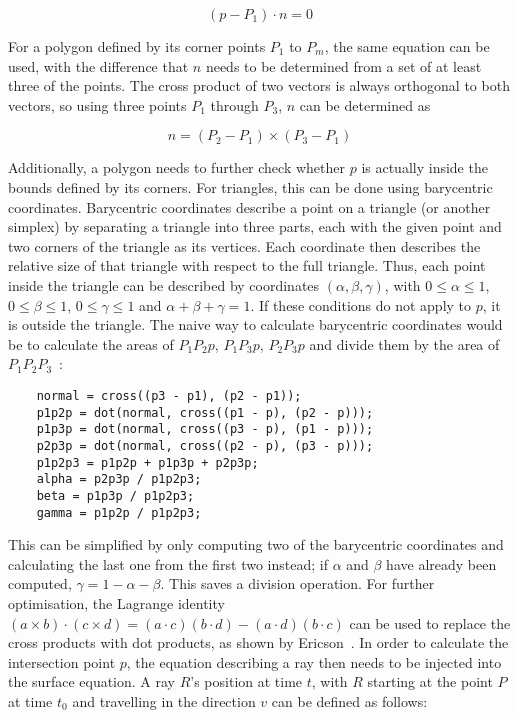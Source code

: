 \begin{equation}\label{StaticSurface}
    (p - P_1) \cdot n = 0
\end{equation}

For a polygon defined by its corner points \(P_{1}\) to \(P_{m}\), the same equation can be used,
with the difference that \(n\) needs to be determined from a set of at least three of the points.
The cross product of two vectors is always orthogonal to both vectors, so using three points \(P_{1}\) through \(P_{3}\),
\(n\) can be determined as

\begin{equation}\label{PolygonNormal}
    n = (P_{2} - P_{1}) \times (P_{3} - P_{1})
\end{equation}

Additionally, a polygon needs to further check whether \(p\) is actually inside the bounds defined by its corners.
For triangles, this can be done using barycentric coordinates.
\newline
Barycentric coordinates describe a point on a triangle (or another simplex) by separating a triangle into three parts,
each with the given point and two corners of the triangle as its vertices.
Each coordinate then describes the relative size of that triangle with respect to the full triangle.
\newline
Thus, each point inside the triangle can be described by coordinates \((\alpha, \beta, \gamma)\),
with \(0 \le \alpha \le 1\), \(0 \le \beta \le 1\), \(0 \le \gamma \le 1\) and \(\alpha + \beta + \gamma = 1\).
If these conditions do not apply to \(p\), it is outside the triangle.
\newline
The naive way to calculate barycentric coordinates would be to calculate the areas of \(P_1P_2p\), \(P_1P_3p\), \(P_2P_3p\) and
divide them by the area of \(P_1P_2P_3\)~\cite{SM09}:
\begin{verbatim}
    normal = cross((p3 - p1), (p2 - p1));
    p1p2p = dot(normal, cross((p1 - p), (p2 - p)));
    p1p3p = dot(normal, cross((p3 - p), (p1 - p)));
    p2p3p = dot(normal, cross((p2 - p), (p3 - p)));
    p1p2p3 = p1p2p + p1p3p + p2p3p;
    alpha = p2p3p / p1p2p3;
    beta = p1p3p / p1p2p3;
    gamma = p1p2p / p1p2p3;
\end{verbatim}
This can be simplified by only computing two of the barycentric coordinates
and calculating the last one from the first two instead; if \(\alpha\) and \(\beta\) have already been computed,
\(\gamma = 1 - \alpha - \beta\). This saves a division operation.
For further optimisation, the Lagrange identity \((a \times b) \cdot (c \times d) = (a \cdot c)(b \cdot d) - (a \cdot d)(b \cdot c)\)
can be used to replace the cross products with dot products, as shown by Ericson~\cite{Er04}.
\newline
In order to calculate the intersection point \(p\), the equation describing a ray then needs to be injected into the surface equation.
A ray \(R\)'s position at time \(t\), with \(R\) starting at the point \(P\) at time \(t_0\)
and travelling in the direction \(v\) can be defined as follows:

